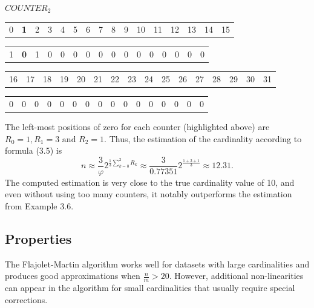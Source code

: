 \documentclass[a4paper,13pt]{article}
\theoremstyle{mytheor}
\begin{document}
\begin{mdframed}
    \vspace{0.25cm}
    $COUNTER_2$
    \begin{center}
        \begin{tabular}{p{0.4cm}p{0.4cm}p{0.4cm}p{0.4cm}p{0.4cm}p{0.4cm}p{0.4cm}p{0.4cm}p{0.4cm}p{0.4cm}p{0.4cm}p{0.4cm}p{0.4cm}p{0.4cm}p{0.4cm}p{0.4cm}}
            0 & \textbf{1} & 2 & 3 & 4 & 5 & 6 & 7 & 8 & 9 & 10 & 11 & 12 & 13 & 14 & 15 %
        \end{tabular}
        \begin{tabular}{|p{0.4cm}|p{0.4cm}|p{0.4cm}|p{0.4cm}|p{0.4cm}|p{0.4cm}|p{0.4cm}|p{0.4cm}|p{0.4cm}|p{0.4cm}|p{0.4cm}|p{0.4cm}|p{0.4cm}|p{0.4cm}|p{0.4cm}|p{0.4cm}|}
            \hline
            1 & \textbf{0} & 1 & 0 & 0 & 0 & 0 & 0 & 0 & 0 & 0 & 0 & 0 & 0 & 0 & 0 \\ \cline{1-16} %
        \end{tabular}
        \begin{tabular}{p{0.4cm}p{0.4cm}p{0.4cm}p{0.4cm}p{0.4cm}p{0.4cm}p{0.4cm}p{0.4cm}p{0.4cm}p{0.4cm}p{0.4cm}p{0.4cm}p{0.4cm}p{0.4cm}p{0.4cm}p{0.4cm}}
            16 & 17 & 18 & 19 & 20 & 21 & 22 & 23 & 24 & 25 & 26 & 27 & 28 & 29 & 30 & 31 %
        \end{tabular}
        \begin{tabular}{|p{0.4cm}|p{0.4cm}|p{0.4cm}|p{0.4cm}|p{0.4cm}|p{0.4cm}|p{0.4cm}|p{0.4cm}|p{0.4cm}|p{0.4cm}|p{0.4cm}|p{0.4cm}|p{0.4cm}|p{0.4cm}|p{0.4cm}|p{0.4cm}|}
            \hline
            0 & 0 & 0 & 0 & 0 & 0 & 0 & 0 & 0 & 0 & 0 & 0 & 0 & 0 & 0 & 0 \\ \cline{1-16} %
        \end{tabular}
    \end{center}

    The left-most positions of zero for each counter (highlighted above) are\\
    $R_0 = 1, R_1 = 3 \text{ and } R_2 = 1$. Thus, the estimation of the cardinality
    according to formula (3.5) is
    \[
        n \approx \frac{3}{\varphi}2^{\frac{1}{3}\sum\limits_{k=0}^{2}R_k} \approx \frac{3}{0.77351}2^{\frac{1+3+1}{3}} \approx 12.31.
    \]
    The computed estimation is very close to the true cardinality value of
    10, and even without using too many counters, it notably outperforms
    the estimation from Example 3.6.
    \vspace{0.25cm}
\end{mdframed}
\subsection*{Properties}
The Flajolet-Martin algorithm works well for datasets with large
cardinalities and produces good approximations when $\frac{n}{m} > 20$. However,
additional non-linearities can appear in the algorithm for small
cardinalities that usually require special corrections.
\end{document}
